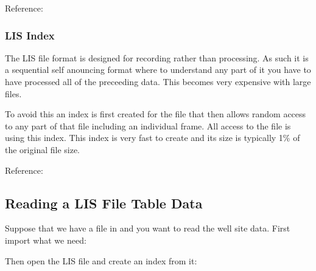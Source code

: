 \documentclass[letterpaper,10pt,english]{sphinxmanual}
\begin{document}
Reference: {\hyperref[\detokenize{ref/LIS/core/File:TotalDepth.LIS.core.File.FileRead}]{}}


\subsubsection{LIS Index}
\label{\detokenize{usage:lis-index}}
The LIS file format is designed for recording rather than processing. As such it is a sequential self anouncing format where to understand any part of it you have to have processed all of the preceeding data. This becomes very expensive with large files.

To avoid this an index is first created for the file that then allows random access to any part of that file including an individual frame. All access to the file is using this index. This index is very fast to create and its size is typically 1\% of the original file size.

Reference: {\hyperref[\detokenize{ref/LIS/core/FileIndexer:TotalDepth.LIS.core.FileIndexer.FileIndex}]{}}


\subsection{Reading a LIS File Table Data}
\label{\detokenize{usage:reading-a-lis-file-table-data}}
Suppose that we have a file in  and you want to read the well site data. First import what we need:

\begin{sphinxVerbatim}[commandchars=\\\{\}]
 
   
   
 
\end{sphinxVerbatim}

Then open the LIS file and create an index from it:
\end{document}
